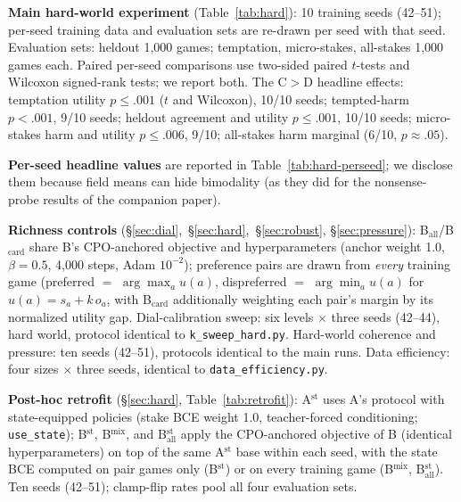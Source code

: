 \documentclass[11pt]{article}
\begin{document}
\textbf{Main hard-world experiment} (Table~\ref{tab:hard}): 10 training seeds (42--51);
per-seed training data and evaluation sets are re-drawn per seed with that seed. Evaluation
sets: heldout 1{,}000 games; temptation, micro-stakes, all-stakes 1{,}000 games each. Paired
per-seed comparisons use two-sided paired $t$-tests and Wilcoxon signed-rank tests; we report
both. The C$>$D headline effects: temptation utility $p{\le}.001$ ($t$ and Wilcoxon), 10/10
seeds; tempted-harm $p{<}.001$, 9/10 seeds; heldout agreement and utility $p{\le}.001$, 10/10
seeds; micro-stakes harm and utility $p{\le}.006$, 9/10; all-stakes harm marginal (6/10,
$p{\approx}.05$).

\textbf{Per-seed headline values} are reported in Table~\ref{tab:hard-perseed}; we
disclose them because field means can hide bimodality (as they did for the nonsense-probe
results of the companion paper).

\textbf{Richness controls} (\S\ref{sec:dial},~\S\ref{sec:hard},~\S\ref{sec:robust},
\S\ref{sec:pressure}): B$_{\mathrm{all}}$/B$_{\mathrm{card}}$ share B's CPO-anchored objective
and hyperparameters (anchor weight 1.0, $\beta{=}0.5$, 4{,}000 steps, Adam $10^{-2}$);
preference pairs are drawn from \emph{every} training game (preferred $=$
$\arg\max_a u(a)$, dispreferred $=$ $\arg\min_a u(a)$ for $u(a) = s_a + k\,o_a$, with
B$_{\mathrm{card}}$ additionally weighting each pair's margin by its normalized utility gap.
Dial-calibration sweep: six levels $\times$ three seeds (42--44), hard world, protocol identical
to \texttt{k\_sweep\_hard.py}. Hard-world coherence and pressure: ten seeds (42--51), protocols
identical to the main runs. Data efficiency: four sizes $\times$ three seeds, identical to
\texttt{data\_efficiency.py}.

\textbf{Post-hoc retrofit} (\S\ref{sec:hard}, Table~\ref{tab:retrofit}):
A$^{\mathrm{st}}$ uses A's protocol with state-equipped policies (stake BCE
weight 1.0, teacher-forced conditioning; \texttt{use\_state}); B$^{\mathrm{st}}$,
B$^{\mathrm{mix}}$, and B$_{\mathrm{all}}^{\mathrm{st}}$ apply the CPO-anchored
objective of B (identical hyperparameters) on top of the same A$^{\mathrm{st}}$
base within each seed, with the state BCE computed on pair games only
(B$^{\mathrm{st}}$) or on every training game (B$^{\mathrm{mix}}$,
B$_{\mathrm{all}}^{\mathrm{st}}$). Ten seeds (42--51); clamp-flip rates pool
all four evaluation sets.
\end{document}
